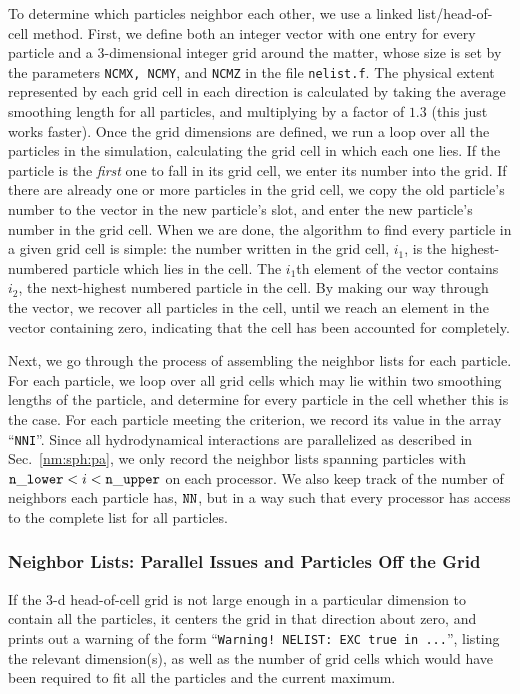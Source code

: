 To determine which
particles neighbor each other, we use a linked list/head-of-cell
method.  First, we define both an integer vector with one entry for
every particle and a 3-dimensional integer grid around the matter,
whose size is set by the parameters {\tt NCMX, NCMY}, and {\tt NCMZ}
in the file {\tt nelist.f}.  The physical extent represented by each
grid cell in each direction is calculated by 
taking the average smoothing length for all particles, and multiplying
by a factor of $1.3$ (this just works faster).  Once the grid
dimensions are defined, we run a loop over all the particles in the
simulation, calculating the grid cell in which each one lies.  If the
particle is the {\em first} one to fall in its grid cell, we enter its
number into the grid.  If there are already one or more particles in
the grid cell, we copy the old particle's number to the vector in the
new particle's slot, and enter the new particle's number in the grid
cell.  When we are done, the algorithm to find every particle in a
given grid cell is simple: the number written in the grid cell, $i_1$,
is the highest-numbered particle which lies in the cell.  The $i_1$th
element of the vector contains $i_2$, the next-highest numbered
particle in the cell.  By making our way through the vector, we
recover all particles in the cell, until we reach an element in the
vector containing zero, indicating that the cell has been accounted
for completely.

Next, we go through the process of assembling the neighbor lists for
each particle.  For each particle, we loop over all grid cells which
may lie within two smoothing lengths of the particle, and determine
for every particle in the cell whether this is the case.  For each
particle meeting the criterion, we record its value in the array
``{\tt NNI}''.  Since all hydrodynamical interactions are parallelized
as described in Sec.~\ref{nm:sph:pa}, 
we only record the neighbor lists spanning
particles with ${\tt n\_lower} < i < {\tt n\_upper}$ on each processor.
We also keep track of the number of neighbors each particle has, ${\tt
NN}$, but in a way such that every processor has access to the
complete list for all particles.  

\subsubsection{Neighbor Lists: Parallel Issues and Particles Off the Grid}
\label{nm:nl:pa}
If the 3-d head-of-cell grid is not
large enough in a particular dimension to contain all the particles,
it centers the grid in that direction about zero, and prints out a
warning of the form ``{\tt Warning! NELIST: EXC true in ...}'', listing
the relevant dimension(s), as well as the number of grid cells which
would have been required to fit all the particles and the current
maximum.  

